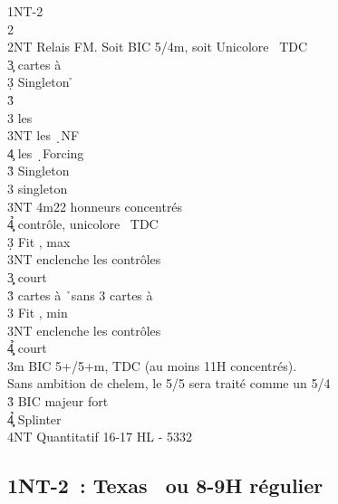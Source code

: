 \documentclass[a4paper]{article}
\begin{document}
\begin{bidtable}
1NT-2\h\\
2\s\+\\
2NT \> Relais FM. Soit BIC 5\s /4m, soit Unicolore \s\ TDC\+\\
3\c {} cartes à \s \+\\
3\d \> Singleton \h \+\\
3\h\+\\
3\s \> les \c \\
3NT \> les \d\ NF\\
4\c \> les \d\ Forcing\-\-\\
3\h \> Singleton \c \\
3\s \> singleton \d \\
3NT \s 4m22 honneurs concentrés\\
4\c\d\h \> contrôle, unicolore \s\ TDC\-\\
3\d \> Fit \s , max\+\\
3NT \> enclenche les contrôles\\
3\c\d \> court\-\\
3\h {} cartes à \h\ sans 3 cartes à \s \\
3\s \> Fit \s , min\+\\
3NT \> enclenche les contrôles\\
4\c\d\h \> court\-\-\\
3m \> BIC 5+\s /5+m, TDC (au moins 11H concentrés).\\
\>Sans ambition de chelem, le 5/5 sera traité comme un 5/4\\
3\h \> BIC majeur fort\\
4\c\d\h \> Splinter\\
4NT \> Quantitatif 16-17 HL - 5332\-
\end{bidtable}

\subsection{1NT-2\pdfs\ : Texas \pdfc\ ou 8-9H régulier}
\end{document}

